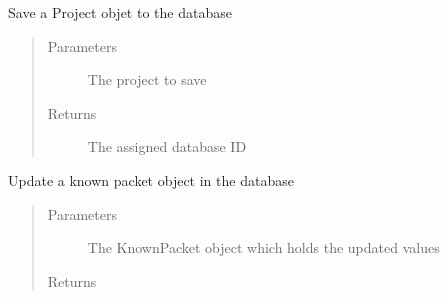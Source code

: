 \documentclass[letterpaper,10pt,english]{sphinxmanual}
\begin{document}
\begin{fulllineitems}
\begin{fulllineitems}
\begin{quote}
\begin{description}
\end{description}\end{quote}

\end{fulllineitems}


\begin{fulllineitems}
\label{\detokenize{src:src.Database.Database.saveProject}}
Save a Project objet to the database
\begin{quote}\begin{description}
\item[{Parameters}] \leavevmode
{} \textendash{} The project to save

\item[{Returns}] \leavevmode
The assigned database ID

\end{description}\end{quote}

\end{fulllineitems}


\begin{fulllineitems}
\label{\detokenize{src:src.Database.Database.updateKnownPacket}}
Update a known packet object in the database
\begin{quote}\begin{description}
\item[{Parameters}] \leavevmode
{} \textendash{} The KnownPacket object which holds the updated values

\item[{Returns}] \leavevmode


\end{description}\end{quote}

\end{fulllineitems}



\end{fulllineitems}
\end{document}
